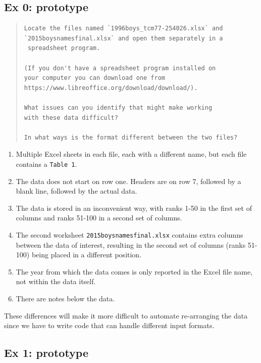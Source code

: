 \documentclass[]{book}
\providecommand{\tightlist}{%
  \setlength{\itemsep}{0pt}\setlength{\parskip}{0pt}}
\begin{document}
\subsection{Ex 0: prototype}\label{ex-0-prototype-3}

\begin{quote}
\begin{verbatim}
Locate the files named `1996boys_tcm77-254026.xlsx` and 
`2015boysnamesfinal.xlsx` and open them separately in a 
 spreadsheet program. 

(If you don't have a spreadsheet program installed on
your computer you can download one from
https://www.libreoffice.org/download/download/). 

What issues can you identify that might make working
with these data difficult?

In what ways is the format different between the two files?
\end{verbatim}
\end{quote}

\begin{enumerate}
\def\labelenumi{\arabic{enumi}.}
\tightlist
\item
  Multiple Excel sheets in each file, each with a different name, but
  each file contains a \texttt{Table\ 1}.
\item
  The data does not start on row one. Headers are on row 7, followed by
  a blank line, followed by the actual data.
\item
  The data is stored in an inconvenient way, with ranks 1-50 in the
  first set of columns and ranks 51-100 in a second set of columns.
\item
  The second worksheet \texttt{2015boysnamesfinal.xlsx} contains extra
  columns between the data of interest, resulting in the second set of
  columns (ranks 51-100) being placed in a different position.
\item
  The year from which the data comes is only reported in the Excel file
  name, not within the data itself.
\item
  There are notes below the data.
\end{enumerate}

These differences will make it more difficult to automate re-arranging
the data since we have to write code that can handle different input
formats.

\subsection{Ex 1: prototype}\label{ex-1-prototype-3}
\end{document}
